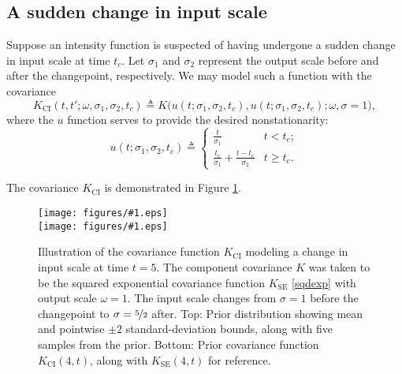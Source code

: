 \documentclass{article}
\newcommand{\deq}{\triangleq}
\newcommand{\psff}[1]{\texttt{[image: figures/\#1.eps]}}
\begin{document}
\subsection{A sudden change in input scale}

Suppose an intensity function is suspected of having undergone a
sudden change in input scale at time $t_c$.  Let $\sigma_1$ and
$\sigma_2$ represent the output scale before and after the changepoint,
respectively.  We may model such a function with the covariance
\begin{equation*}
  K_{\text{CI}}(t, t'; \omega, \sigma_1, \sigma_2, t_c)
  \deq 
  K
  \bigl(
    u(t; \sigma_1, \sigma_2, t_c), 
    u(t; \sigma_1, \sigma_2, t_c); 
    \omega, \sigma = 1 
  \bigr),
\end{equation*}
where the $u$ function serves to provide the desired nonstationarity:
\begin{equation}
  \label{inchange}
  u(t; \sigma_1, \sigma_2, t_c) 
  \deq
  \begin{cases}
    \frac{t}{\sigma_1} 
    & t < t_c; \\
    \frac{t_c}{\sigma_1} + \frac{t - t_c}{\sigma_2} 
    & t \geq t_c.
  \end{cases}
\end{equation}

The covariance $K_{\text{CI}}$ is demonstrated in Figure
\ref{fig:changeinput}.

\begin{figure}
  \centering
  \psff{changepointcovsamples2} \\
  \bigskip
  \psff{changepointcov2}\medskip
  \caption{Illustration of the covariance function $K_{\text{CI}}$
    modeling a change in input scale at time $t = \text{5}$.  The
    component covariance $K$ was taken to be the squared exponential
    covariance function $K_{\text{SE}}$ \eqref{sqdexp} with output
    scale $\omega = 1$.  The input scale changes from $\sigma = 1$
    before the changepoint to $\sigma = \nicefrac{5}{2}$ after. Top:
    Prior distribution showing mean and pointwise $\pm 2$
    standard-deviation bounds, along with five samples from the prior.
    Bottom: Prior covariance function $K_{\text{CI}}(4, t)$, along
    with $K_{\text{SE}}(4, t)$ for reference.  }
  \label{fig:changeinput}
\end{figure}
\end{document}
